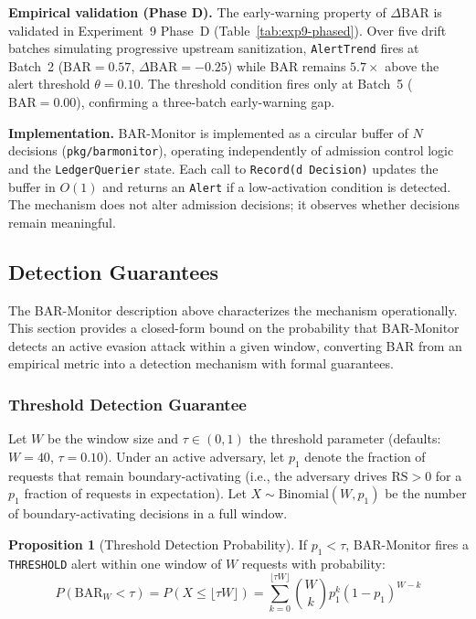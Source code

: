 \documentclass[11pt]{article}
\theoremstyle{definition}
\newtheorem{proposition}{Proposition}
\begin{document}
\textbf{Empirical validation (Phase D).}
The early-warning property of $\Delta\mathrm{BAR}$ is validated in
Experiment~9 Phase~D (Table~\ref{tab:exp9-phased}).
Over five drift batches simulating progressive upstream sanitization,
\texttt{AlertTrend} fires at Batch~2 ($\mathrm{BAR}=0.57$,
$\Delta\mathrm{BAR}=-0.25$) while BAR remains $5.7\times$ above the
alert threshold $\theta=0.10$.
The threshold condition fires only at Batch~5 ($\mathrm{BAR}=0.00$),
confirming a three-batch early-warning gap.

\textbf{Implementation.}
BAR-Monitor is implemented as a circular buffer of $N$ decisions
(\texttt{pkg/barmonitor}), operating independently of admission control logic
and the \texttt{LedgerQuerier} state.
Each call to \texttt{Record(d~Decision)} updates the buffer in $O(1)$ and
returns an \texttt{Alert} if a low-activation condition is detected.
The mechanism does not alter admission decisions; it observes whether
decisions remain meaningful.

\subsection{Detection Guarantees}
\label{sec:detection-guarantees}

The BAR-Monitor description above characterizes the mechanism operationally.
This section provides a closed-form bound on the probability that BAR-Monitor
detects an active evasion attack within a given window, converting BAR from
an empirical metric into a detection mechanism with formal guarantees.

\subsubsection*{Threshold Detection Guarantee}

Let $W$ be the window size and $\tau \in (0,1)$ the threshold parameter
(defaults: $W=40$, $\tau=0.10$).
Under an active adversary, let $p_1$ denote the fraction of requests that
remain boundary-activating (i.e., the adversary drives $\mathrm{RS} > 0$ for
a $p_1$ fraction of requests in expectation).
Let $X \sim \mathrm{Binomial}(W, p_1)$ be the number of boundary-activating
decisions in a full window.

\begin{proposition}[Threshold Detection Probability]
\label{prop:threshold-detection}
If $p_1 < \tau$, BAR-Monitor fires a \texttt{THRESHOLD} alert within one window
of $W$ requests with probability:
\[
  P\!\left(\mathrm{BAR}_W < \tau\right)
  = P(X \leq \lfloor \tau W \rfloor)
  = \sum_{k=0}^{\lfloor \tau W \rfloor} \binom{W}{k} p_1^k (1-p_1)^{W-k}
\]
\end{proposition}
\end{document}
